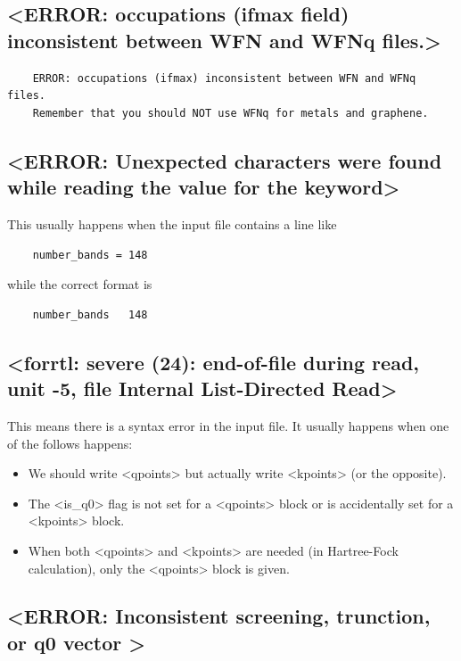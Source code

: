 \documentclass[hyperref, a4paper, 12pt]{report}
\def\texttt#1{<#1>}%
\newcommand{\shortcode}[1]{\texttt{#1}}
\begin{document}
\subsection{\shortcode{ERROR: occupations (ifmax field) inconsistent between WFN and WFNq files.}}

\begin{lstlisting}
    ERROR: occupations (ifmax) inconsistent between WFN and WFNq files.
    Remember that you should NOT use WFNq for metals and graphene.  
\end{lstlisting}

\subsection{\shortcode{ERROR: Unexpected characters were found while reading the value for the keyword}}

This usually happens when the input file contains a line like 
\begin{lstlisting}
    number_bands = 148 
\end{lstlisting}
while the correct format is 
\begin{lstlisting}
    number_bands   148 
\end{lstlisting}

\subsection{\shortcode{forrtl: severe (24): end-of-file during read, unit -5, file Internal List-Directed Read}}

This means there is a syntax error in the input file.
It usually happens when one of the follows happens:
\begin{itemize}
    \item We should write \shortcode{qpoints} but actually write \shortcode{kpoints}
    (or the opposite).
    \item The \shortcode{is_q0} flag is not set for a \shortcode{qpoints} block
    or is accidentally set for a \shortcode{kpoints} block.
    \item When both \shortcode{qpoints} and \shortcode{kpoints} are needed
    (in Hartree-Fock calculation), 
    only the \shortcode{qpoints} block is given.
\end{itemize}

\subsection{\shortcode{ERROR: Inconsistent screening, trunction, or q0 vector  }}
\end{document}
